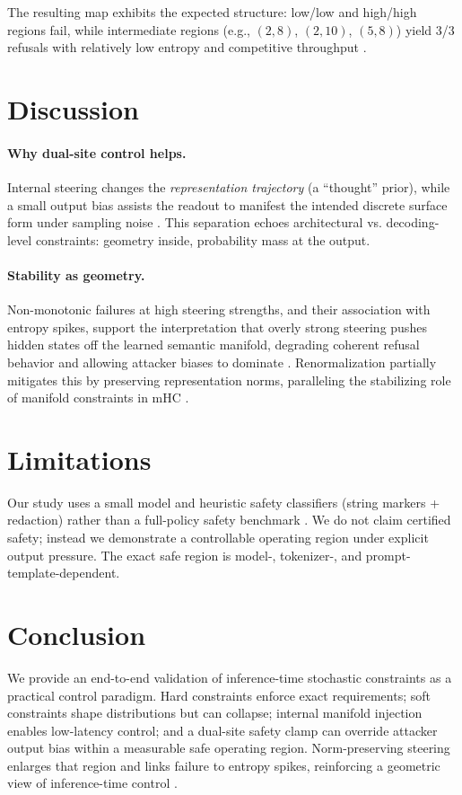 \documentclass{article}
\begin{document}
The resulting map exhibits the expected structure: low/low and high/high regions fail, while intermediate regions (e.g., $(2,8)$, $(2,10)$, $(5,8)$) yield 3/3 refusals with relatively low entropy and competitive throughput \citep{thiswork2026}.

\section{Discussion}

\paragraph{Why dual-site control helps.}
Internal steering changes the \emph{representation trajectory} (a ``thought'' prior), while a small output bias assists the readout to manifest the intended discrete surface form under sampling noise \citep{thiswork2026}.
This separation echoes architectural vs. decoding-level constraints: geometry inside, probability mass at the output.

\paragraph{Stability as geometry.}
Non-monotonic failures at high steering strengths, and their association with entropy spikes, support the interpretation that overly strong steering pushes hidden states off the learned semantic manifold, degrading coherent refusal behavior and allowing attacker biases to dominate \citep{thiswork2026}.
Renormalization partially mitigates this by preserving representation norms, paralleling the stabilizing role of manifold constraints in mHC \citep{deepseekmhc2025}.

\section{Limitations}
Our study uses a small model and heuristic safety classifiers (string markers + redaction) rather than a full-policy safety benchmark \citep{thiswork2026}.
We do not claim certified safety; instead we demonstrate a controllable operating region under explicit output pressure.
The exact safe region is model-, tokenizer-, and prompt-template-dependent.

\section{Conclusion}
We provide an end-to-end validation of inference-time stochastic constraints as a practical control paradigm.
Hard constraints enforce exact requirements; soft constraints shape distributions but can collapse; internal manifold injection enables low-latency control; and a dual-site safety clamp can override attacker output bias within a measurable safe operating region.
Norm-preserving steering enlarges that region and links failure to entropy spikes, reinforcing a geometric view of inference-time control \citep{deepseekmhc2025,thiswork2026}.
\end{document}
